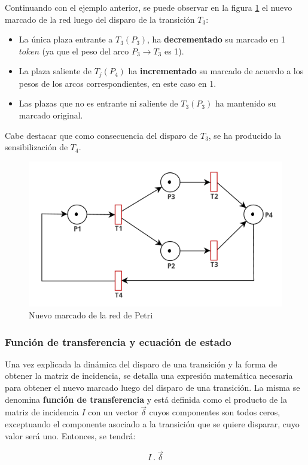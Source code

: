 Continuando con el ejemplo anterior, se puede observar en la figura \ref{fig:rdp_marcado_nuevo} el nuevo marcado de la red luego del disparo de la transición $T_3$:

\begin{itemize}
    \item La única plaza entrante a $T_3(P_3 )$, ha \textbf{decrementado} su marcado en 1 $token$ (ya que el peso del arco $P_3 \rightarrow T_3$ es 1).
    \item La plaza saliente de $T_j(P_4)$ ha \textbf{incrementado} su marcado de acuerdo a los pesos de los arcos correspondientes, en este caso en 1.
    \item Las plazas que no es entrante ni saliente de $T_3(P_3)$ ha mantenido su marcado original.
\end{itemize}

Cabe destacar que como consecuencia del disparo de $T_3$, se ha producido la sensibilización de $T_4$.

\begin{figure}[H]
    \centering
    \includegraphics[width=0.6\linewidth]{images/rdp_marcado_nuevo.png}
    \caption{Nuevo marcado de la red de Petri}
    \label{fig:rdp_marcado_nuevo}
\end{figure}

\subsubsection{Función de transferencia y ecuación de estado}
Una vez explicada la dinámica del disparo de una transición y la forma de obtener la matriz de incidencia, se detalla una expresión matemática necesaria para obtener el nuevo marcado luego del disparo de una transición. 
La misma se denomina \textbf{función de transferencia} y está definida como el producto de la matriz de incidencia $I$ con un vector $\vec{\delta}$ cuyos componentes son todos ceros, exceptuando el componente asociado a la transición que se quiere disparar, cuyo valor será uno. Entonces, se tendrá:

\begin{equation}
    I \ . \ \vec{\delta }
\end{equation}

